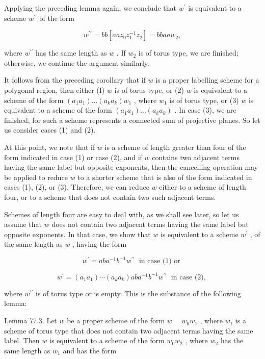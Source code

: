 \documentclass[10pt]{article}
\begin{document}
Applying the preceding lemma again, we conclude that \({w}^{\prime }\) is equivalent to a scheme \({w}^{\prime \prime }\) of the form

\[
{w}^{\prime \prime } = {bb}\left\lbrack  {{aa}{z}_{0}{z}_{1}^{-1}{z}_{2}}\right\rbrack   = {bbaa}{w}_{2},
\]

where \({w}^{\prime \prime }\) has the same length as \(w\) . If \({w}_{2}\) is of torus type, we are finished; otherwise, we continue the argument similarly.

It follows from the preceding corollary that if \(w\) is a proper labelling scheme for a polygonal region, then either (I) \(w\) is of torus type, or (2) \(w\) is equivalent to a scheme of the form \(\left( {{a}_{1}{a}_{1}}\right) \ldots \left( {{a}_{k}{a}_{k}}\right) {w}_{1}\) , where \({w}_{1}\) is of torus type, or (3) \(w\) is equivalent to a scheme of the form \(\left( {{a}_{1}{a}_{1}}\right) \ldots \left( {{a}_{k}{a}_{k}}\right)\) . In case (3), we are finished, for such a scheme represents a connected sum of projective planes. So let us consider cases (1) and (2).

At this point, we note that if \(w\) is a scheme of length greater than four of the form indicated in case (1) or case (2), and if \(w\) contains two adjacent terms having the same label but opposite exponents, then the cancelling operation may be applied to reduce \(w\) to a shorter scheme that is also of the form indicated in cases (1), (2), or (3). Therefore, we can reduce \(w\) either to a scheme of length four, or to a scheme that does not contain two such adjacent terms.

Schemes of length four are easy to deal with, as we shall see later, so let us assume that \(w\) does not contain two adjacent terms having the same label but opposite exponents. In that case, we show that \(w\) is equivalent to a scheme \({w}^{\prime }\) , of the same length as \(w\) , having the form

\[
{w}^{\prime } = {ab}{a}^{-1}{b}^{-1}{w}^{\prime \prime }\;\text{ in case (1) or }
\]

\[
{w}^{\prime } = \left( {{a}_{1}{a}_{1}}\right) \cdots \left( {{a}_{k}{a}_{k}}\right) {ab}{a}^{-1}{b}^{-1}{w}^{\prime \prime }\;\text{ in case (2), }
\]

where \({w}^{\prime \prime }\) is of torus type or is empty. This is the substance of the following lemma:

Lemma 77.3. Let \(w\) be a proper scheme of the form \(w = {w}_{0}{w}_{1}\) , where \({w}_{1}\) is a scheme of torus type that does not contain two adjacent terms having the same label. Then \(w\) is equivalent to a scheme of the form \({w}_{0}{w}_{2}\) , where \({w}_{2}\) has the same length as \({w}_{1}\) and has the form
\end{document}
